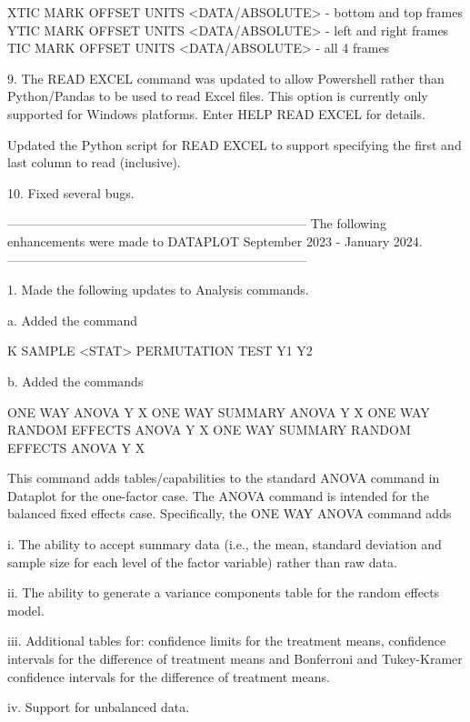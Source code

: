         XTIC MARK OFFSET UNITS <DATA/ABSOLUTE>  - bottom and top frames
        YTIC MARK OFFSET UNITS <DATA/ABSOLUTE>  - left and right frames
        TIC MARK OFFSET UNITS <DATA/ABSOLUTE>   - all 4 frames

 9. The READ EXCEL command was updated to allow Powershell rather than
    Python/Pandas to be used to read Excel files.  This option is
    currently only supported for Windows platforms.  Enter HELP READ
    EXCEL for details.

    Updated the Python script for READ EXCEL to support specifying
    the first and last column to read (inclusive).

10. Fixed several bugs.

-----------------------------------------------------------------------
The following enhancements were made to DATAPLOT
September 2023 - January 2024.
-----------------------------------------------------------------------

 1. Made the following updates to Analysis commands.

    a. Added the command

         K SAMPLE <STAT> PERMUTATION TEST Y1 Y2

    b. Added the commands

         ONE WAY ANOVA Y X
         ONE WAY SUMMARY ANOVA Y X
         ONE WAY RANDOM EFFECTS ANOVA Y X
         ONE WAY SUMMARY RANDOM EFFECTS ANOVA Y X

       This command adds tables/capabilities to the standard ANOVA
       command in Dataplot for the one-factor case.  The ANOVA command
       is intended for the balanced fixed effects case.  Specifically,
       the ONE WAY ANOVA command adds

           i. The ability to accept summary data (i.e., the
              mean, standard deviation and sample size for
              each level of the factor variable) rather than
              raw data.

          ii. The ability to generate a variance components table
              for the random effects model.

         iii. Additional tables for: confidence limits for the
              treatment means, confidence intervals for the
              difference of treatment means and Bonferroni and
              Tukey-Kramer confidence intervals for the difference
              of treatment means.

          iv. Support for unbalanced data.

